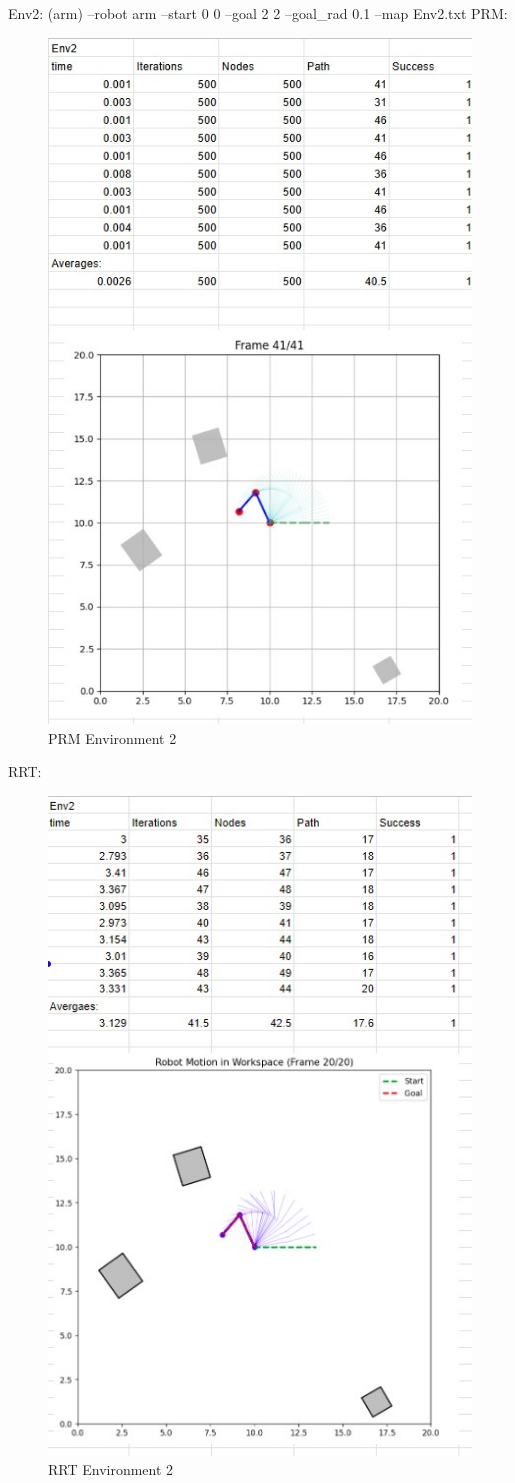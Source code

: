 \documentclass{article}
\begin{document}
Env2: (arm) \newline
--robot arm --start 0 0 --goal 2 2 --goal\_rad 0.1 --map Env2.txt \newline
    PRM:
    \begin{figure} [H]
        \centering
        \includegraphics[width=0.5\linewidth]{latex_media/PRMEnv2Stats.jpg}
        \caption{PRM Environment 2}
    \end{figure}
    RRT: 
    \begin{figure} [H]
        \centering
        \includegraphics[width=0.5\linewidth]{latex_media/RRTEnv2Stats.jpg}
        \caption{RRT Environment 2}
    \end{figure}
\end{document}

